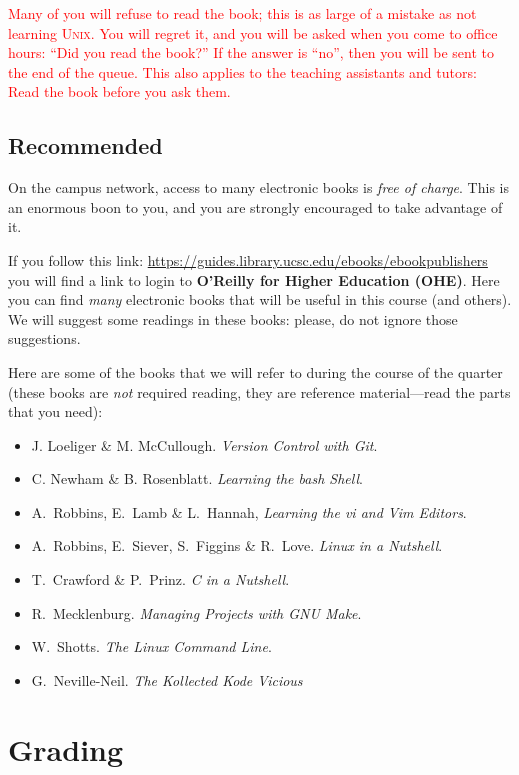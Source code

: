 \documentclass[11pt]{article}
\begin{document}
\textcolor{red}{Many of you will refuse to read the book; this is
as large of a mistake as not learning \textsc{Unix}. You will regret
it, and you will be asked when you come to office hours: ``Did you
read the book?'' If the answer is ``no'', then you will be sent to
the end of the queue. This also applies to the teaching assistants
and tutors: Read the book before you ask them.}

\subsection{Recommended}

On the campus network, access to many electronic books is \emph{free of
charge}. This is an enormous boon to you, and you are strongly
encouraged to take advantage of it.

If you follow this link:
\url{https://guides.library.ucsc.edu/ebooks/ebookpublishers} you will
find a link to login to \textbf{O'Reilly for Higher Education (OHE)}.
Here you can find \emph{many} electronic books that will be useful in
this course (and others). We will suggest some readings in these books:
please, do not ignore those suggestions.

Here are some of the books that we will refer to during the course of the
quarter (these books are \emph{not} required reading, they are reference material---read the parts that you need):
\begin{itemize}
  \item J.\xspace Loeliger \& M.\xspace McCullough. \emph{Version Control with
    Git}.
  \item C.\xspace Newham \& B.\xspace Rosenblatt. \emph{Learning the bash
    Shell}.
  \item A.\ Robbins, E.\ Lamb \& L.\ Hannah, \emph{Learning the vi and Vim
    Editors}.
  \item A.\ Robbins, E.\ Siever, S.\ Figgins \& R.\ Love. \emph{Linux in a
    Nutshell}.
  \item T.\ Crawford \& P.\ Prinz. \emph{C in a Nutshell}.
  \item R.\ Mecklenburg. \emph{Managing Projects with GNU Make}.
  \item W.\ Shotts. \emph{The Linux Command Line}.
  \item G.\ Neville-Neil. \emph{The Kollected Kode Vicious}
\end{itemize}

\section{Grading}
\end{document}
